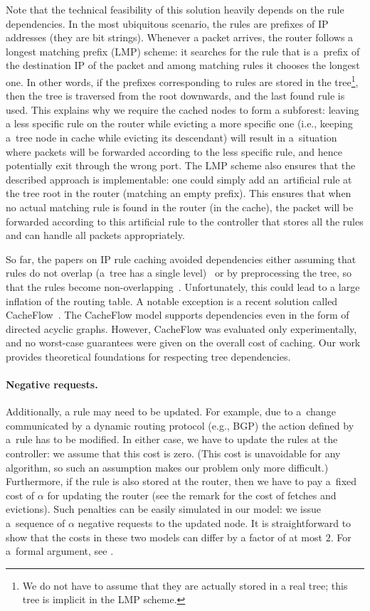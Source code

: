 Note that the technical feasibility of this solution heavily depends on the
rule dependencies. In the most ubiquitous scenario, the rules are prefixes of
IP addresses (they are bit strings). Whenever a packet arrives, the router
follows a longest matching prefix (LMP) scheme: it searches for the rule that
is a~prefix of the destination IP of the packet and among matching rules it
chooses the longest one. In other words, if the prefixes corresponding to
rules are stored in the tree\footnote{We do not have to assume that they are
actually stored in a real tree; this tree is implicit in the LMP scheme.},
then the tree is traversed from the root downwards, and the last found rule is
used. This explains why we require the cached nodes to form a subforest:
leaving a less specific rule on the router while evicting a more specific one
(i.e., keeping a~tree node in cache while evicting its descendant) will result
in a~situation where packets will be forwarded according to the less specific
rule, and hence potentially exit through the wrong port. The LMP scheme also
ensures that the described approach is implementable: one could simply add
an~artificial rule at the tree root in the router (matching an empty prefix).
This ensures that when no actual matching rule is found in the router (in the
cache), the packet will be forwarded according to this artificial rule to the
controller that stores all the rules and can handle all packets appropriately.

So far, the papers on IP rule caching avoided dependencies either assuming
that rules do not overlap (a~tree has a single level)~\cite{route-caching-flat} 
or by preprocessing the tree, so that the rules become
non-overlapping~\cite{prefix-caching,fib-caching-non-overlapping}.
Unfortunately, this could lead to a large inflation of the routing table. A
notable exception is a recent solution called CacheFlow~\cite{cacheflow}. The
CacheFlow model supports dependencies even in the form of directed acyclic
graphs. However, CacheFlow was evaluated only experimentally, and no
worst-case guarantees were given on the overall cost of caching. Our work
provides theoretical foundations for respecting tree dependencies.

\paragraph{Negative requests.}

Additionally, a rule may need to be updated. For example, due to a~change
communicated by a dynamic routing protocol (e.g., BGP) the action defined by
a~rule has to be modified. In either case, we have to update the rules at the
controller: we assume that this cost is zero. (This cost is unavoidable for
any algorithm, so such an assumption makes our problem only more difficult.)
Furthermore, if the rule is also stored at the router, then we have to pay a~fixed
cost of $\alpha$ for updating the router (see the remark for the cost of
fetches and evictions). Such penalties can be easily simulated in our model:
we issue a~sequence of $\alpha$ negative requests to the updated node.  It is
straightforward to show that the costs in these two models can differ by a
factor of at most $2$. For a~formal argument, see
.

